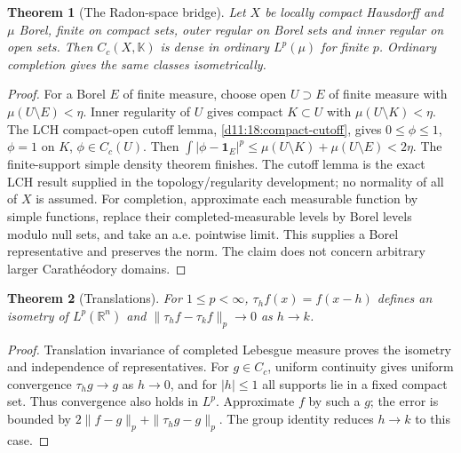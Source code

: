 \documentclass[11pt,oneside,openany]{book}
\newtheorem{theorem}{Theorem}[chapter]
\theoremstyle{definition}
\theoremstyle{remark}
\newcommand{\R}{\mathbb R}\newcommand{\C}{\mathbb C}
\newcommand{\one}{\mathbf1}\newcommand{\ind}[1]{\mathbf1_{#1}}
\newcommand{\family}[1]{}
\begin{document}
\begin{theorem}[The Radon-space bridge]\family{D11.11.radon_cc_density_bridge}\label{d11:11:radon-cc-density-bridge}
Let $X$ be locally compact Hausdorff and $\mu$ Borel, finite on compact
sets, outer regular on Borel sets and inner regular on open sets.
Then $C_c(X,\mathbb K)$ is dense in ordinary $L^p(\mu)$ for finite $p$.
Ordinary completion gives the same classes isometrically.
\end{theorem}
\begin{proof}
For a Borel $E$ of finite measure, choose open $U\supset E$ of finite
measure with $\mu(U\setminus E)<\eta$. Inner regularity of $U$ gives
compact $K\subset U$ with $\mu(U\setminus K)<\eta$.
The LCH compact-open cutoff lemma, \cref{d11:18:compact-cutoff}, gives
$0\leq\phi\leq1$, $\phi=1$
on $K$, $\phi\in C_c(U)$. Then
$\int|\phi-\one_E|^p\leq\mu(U\setminus K)+\mu(U\setminus E)<2\eta$.
The finite-support simple density theorem finishes. The cutoff lemma is
the exact LCH result supplied in the topology/regularity development; no
normality of all of $X$ is assumed. For completion, approximate each
measurable function by simple functions, replace their completed-measurable
levels by Borel levels modulo null sets, and take an a.e. pointwise limit.
This supplies a Borel representative and preserves the norm. The claim
does not concern arbitrary larger Carath\'eodory domains.
\end{proof}

\begin{theorem}[Translations]\family{D11.11.translation_continuity}\label{d11:11:translation-continuity}
For $1\leq p<\infty$, $\tau_hf(x)=f(x-h)$ defines an isometry of
$L^p(\R^n)$ and $\|\tau_hf-\tau_kf\|_p\to0$ as $h\to k$.
\end{theorem}
\begin{proof}
Translation invariance of completed Lebesgue measure proves the isometry
and independence of representatives. For $g\in C_c$, uniform continuity
gives uniform convergence $\tau_hg\to g$ as $h\to0$, and for $|h|\leq1$
all supports lie in a fixed compact set. Thus convergence also holds in
$L^p$. Approximate $f$ by such a $g$; the error is bounded by
$2\|f-g\|_p+\|\tau_hg-g\|_p$. The group identity reduces $h\to k$ to
this case.
\end{proof}
\end{document}
